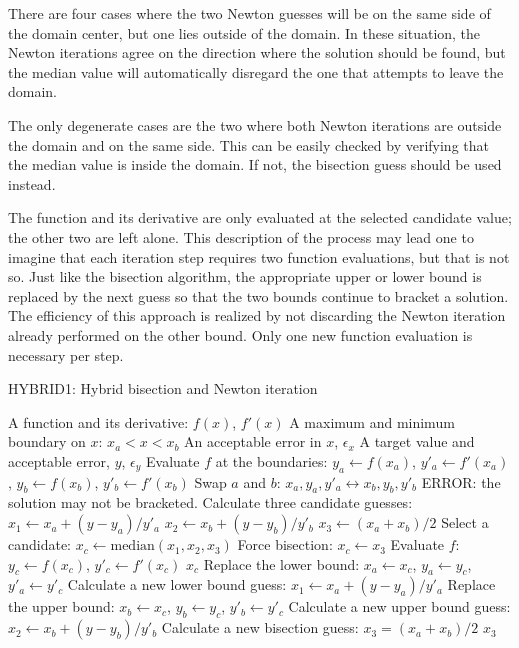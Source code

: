 \documentclass{article}
\begin{document}
There are four cases where the two Newton guesses will be on the same side of the domain center, but one lies outside of the domain.  In these situation, the Newton iterations agree on the direction where the solution should be found, but the median value will automatically disregard the one that attempts to leave the domain.

The only degenerate cases are the two where both Newton iterations are outside the domain and on the same side.  This can be easily checked by verifying that the median value is inside the domain.  If not, the bisection guess should be used instead.

The function and its derivative are only evaluated at the selected candidate value; the other two are left alone.  This description of the process may lead one to imagine that each iteration step requires two function evaluations, but that is not so.  Just like the bisection algorithm, the appropriate upper or lower bound is replaced by the next guess so that the two bounds continue to bracket a solution.  The efficiency of this approach is realized by not discarding the Newton iteration already performed on the other bound.  Only one new function evaluation is necessary per step.

\begin{algorithm}
\caption{HYBRID1: Hybrid bisection and Newton iteration}\label{alg:hybrid1}
\begin{algorithmic}
\REQUIRE A function and its derivative: $f(x)$, $f'(x)$
\REQUIRE A maximum and minimum boundary on $x$: $x_a < x <x_b$
\REQUIRE An acceptable error in $x$, $\epsilon_x$
\REQUIRE A target value and acceptable error, $y$, $\epsilon_y$
\STATE Evaluate $f$ at the boundaries: 
\STATE $y_a \leftarrow f(x_a)$, $y'_a \leftarrow f'(x_a)$, $y_b \leftarrow f(x_b)$, $y'_b \leftarrow f'(x_b)$
\STATE Swap $a$ and $b$: 
\STATE $x_a,y_a,y'_a \leftrightarrow x_b,y_b,y'_b$
\ENDIF
{}
\RETURN ERROR: the solution may not be bracketed.
\ENDIF
\STATE Calculate three candidate guesses:
\STATE $x_1 \leftarrow x_a + (y-y_a)/y'_a$
\STATE $x_2 \leftarrow x_b + (y-y_b)/y'_b$
\STATE $x_3 \leftarrow (x_a + x_b)/2$
\STATE Select a candidate: 
\STATE $x_c \leftarrow \mathrm{median}(x_1,x_2,x_3)$
\STATE Force bisection: 
\STATE $x_c \leftarrow x_3$
\ENDIF
\STATE Evaluate $f$: 
\STATE $y_c \leftarrow f(x_c)$, $y'_c\leftarrow f'(x_c)$
\RETURN $x_c$
\ENDIF
{}
\STATE Replace the lower bound: 
\STATE $x_a \leftarrow x_c$, $y_a \leftarrow y_c$, $y'_a \leftarrow y'_c$
\STATE Calculate a new lower bound guess:
\STATE $x_1 \leftarrow x_a + (y - y_a)/y'_a$
\ELSE
\STATE Replace the upper bound:
\STATE $x_b \leftarrow x_c$, $y_b \leftarrow y_c$, $y'_b \leftarrow y'_c$
\STATE Calculate a new upper bound guess:
\STATE $x_2 \leftarrow x_b + (y - y_b)/y'_b$
\ENDIF
\STATE Calculate a new bisection guess:
\STATE $x_3 = (x_a + x_b)/2$
\ENDWHILE
\RETURN $x_3$
\end{algorithmic}
\end{algorithm}
\end{document}
